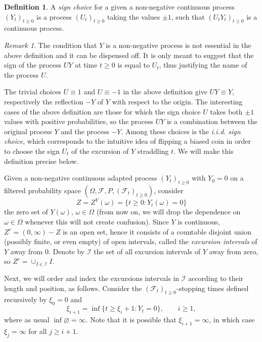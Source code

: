 \documentclass[reqno]{amsart}
\theoremstyle{definition}
\newtheorem{definition}[theorem]{Definition}
\theoremstyle{remark}
\newtheorem{remark}[theorem]{Remark}
\numberwithin{equation}{section}
\begin{document}
\begin{definition}\label{sign choice}
A \emph{sign choice} for a given a non-negative continuous process $\left(
Y_{t}\right) _{t\geq 0}$ is a process $\left( U_{t}\right) _{t\geq 0}$ taking the values $\pm 1$, such that $\left( U_{t}Y_{t}\right) _{t\geq 0}$ is a continuous
process.
\end{definition}

\begin{remark}
The condition that $Y$ is a non-negative process is not essential in the above definition and it can be dispensed off. It is only meant to suggest that the sign of the process $UY$ at time $t\ge 0$ is equal to $U_t$, thus justifying the name of the process $U$.
\end{remark}

The trivial choices $U \equiv 1$ and $U \equiv -1$ in the above definition give $U Y\equiv Y$, respectively the reflection $- Y$ of $Y$ with respect to the origin. The interesting cases of the above definition are those for which the sign choice $U$ takes both $\pm 1$ values  with positive probabilities, so the process $U Y$ is a combination between the original process $Y$ and the process $-Y$. Among these choices is the \emph{i.i.d. sign choice}, which corresponds to the intuitive idea of flipping a biased coin in order to choose the sign $U_t$ of the excursion of $Y$ straddling $t$. We will make this definition precise below.

Given a non-negative continuous adapted process $(Y_t)_{t\geq 0}$ with $Y_0=0$ on a filtered probability  space $(\Omega, \mathcal{F},P, (\mathcal{F}_t)_{t \geq 0})$, consider $${Z}={Z}^Y(\omega)=\{t\geq 0 :Y_t(\omega)=0\}$$ the zero set of $Y(\omega)$, $\omega\in\Omega$ (from now on, we will drop the dependence on $\omega\in \Omega$ whenever this will not create confusion). Since $Y$ is continuous, ${Z}^c=(0,\infty)-{Z}$ is an open set, hence it consists of a countable disjoint union (possibly finite, or even empty) of open intervals, called the \emph{excursion intervals} of $Y$ away from $0$. Denote by $\mathcal{I}$ the set of all excursion intervals of $Y$ away from zero, so ${Z}^c=\cup_{I\in \mathcal{I}} I$.

Next, we will order and index the excursions intervals in $\mathcal{I}$ according to their length and position, as follows. Consider the $(\mathcal{F}_t)_{t\ge 0}$-stopping times defined recursively by $\xi_0=0$ and
\begin{equation}
\xi_{i+1}=\inf\{t\geq \xi_i+1: Y_t=0\},\qquad i \geq 1,
\label{stopping times tau_m}
\end{equation}
where as usual $\inf \varnothing = \infty$. Note that it is possible that $\xi_{i+1}= \infty$, in which case $\xi_j=\infty$ for all $j\geq i+1$.
\end{document}
